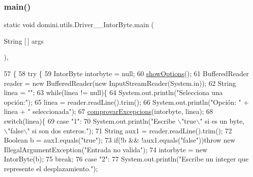 \subsubsection{\texorpdfstring{main()}{main()}}
{\footnotesize\ttfamily static void domini.\+utils.\+Driver\+\_\+\+\_\+\+Intor\+Byte.\+main (\begin{DoxyParamCaption}\item[{String \mbox{[}$\,$\mbox{]}}]{args }\end{DoxyParamCaption})\hspace{0.3cm}{\ttfamily [inline]}, {\ttfamily [static]}}


\begin{DoxyCode}
57                                            \{
58     \textcolor{keywordflow}{try} \{
59         IntorByte intorbyte = null;
60         \hyperlink{classdomini_1_1utils_1_1Driver____IntorByte_a4b647dae1760fc058de9a7311595d8dd}{showOptions}();
61         BufferedReader reader = \textcolor{keyword}{new} BufferedReader(\textcolor{keyword}{new} InputStreamReader(System.in));
62         String linea = \textcolor{stringliteral}{""};
63         \textcolor{keywordflow}{while}(linea != null)\{
64             System.out.println(\textcolor{stringliteral}{"Selecciona una opción:"});
65             linea = reader.readLine().trim();
66             System.out.println(\textcolor{stringliteral}{"Opción: "} + linea + \textcolor{stringliteral}{" seleccionada"});
67             \hyperlink{classdomini_1_1utils_1_1Driver____IntorByte_a3cb28e1e1b318e0b8e4809ebd171c8b2}{comprovarExcepcions}(intorbyte, linea);
68             \textcolor{keywordflow}{switch}(linea)\{
69                 \textcolor{keywordflow}{case} \textcolor{stringliteral}{"1"}:
70                     System.out.println(\textcolor{stringliteral}{"Escribe \(\backslash\)"true\(\backslash\)" si es un byte, \(\backslash\)"false\(\backslash\)" si son dos enteros."});
71                     String aux1 = reader.readLine().trim();
72                     Boolean b = aux1.equals(\textcolor{stringliteral}{"true"});
73                     \textcolor{keywordflow}{if}(!b && !aux1.equals(\textcolor{stringliteral}{"false"}))\textcolor{keywordflow}{throw} \textcolor{keyword}{new} IllegalArgumentException(\textcolor{stringliteral}{"Entrada no valida"});
74                     intorbyte = \textcolor{keyword}{new} IntorByte(b);
75                 \textcolor{keywordflow}{break};
76                 \textcolor{keywordflow}{case} \textcolor{stringliteral}{"2"}:
77                     System.out.println(\textcolor{stringliteral}{"Escribe un integer que represente el desplazamiento."});

\end{DoxyCode}
